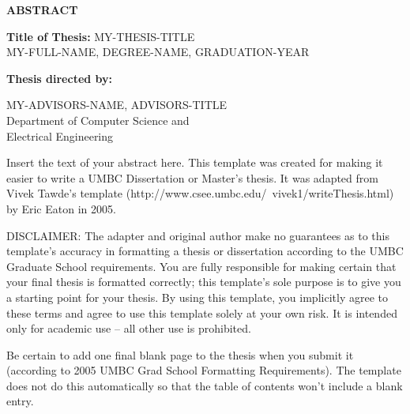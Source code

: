 \newpage
\pagestyle{empty}

\begin{center}
\vspace{0.1in}
\large{\bf ABSTRACT} \par  
\bigskip \bigskip
\end{center}

\begin{flushleft}
{\bf Title of Thesis:} MY-THESIS-TITLE\\
MY-FULL-NAME, DEGREE-NAME, GRADUATION-YEAR \\
\begin{singlespace}
{\bf Thesis directed by:}{\hspace{2.5mm}} \parbox[t]{3in}{MY-ADVISORS-NAME, ADVISORS-TITLE \\
Department of Computer Science and \\ Electrical Engineering}
\end{singlespace}
\end{flushleft}

Insert the text of your abstract here.  This template was created for making it easier to write a UMBC Dissertation or Master's thesis.  It was adapted from Vivek Tawde's template (http://www.csee.umbc.edu/~vivek1/writeThesis.html) by Eric Eaton in 2005.  

DISCLAIMER:  The adapter and original author make no guarantees as to this template's accuracy in formatting a thesis or dissertation according to the UMBC Graduate School requirements.  You are fully responsible for making certain that your final thesis is formatted correctly; this template's sole purpose is to give you a starting point for your thesis.  By using this template, you implicitly agree to these terms and agree to use this template solely at your own risk.  It is intended only for academic use -- all other use is prohibited.

Be certain to add one final blank page to the thesis when you submit it (according to 2005 UMBC Grad School Formatting Requirements).  The template does not do this automatically so that the table of contents won't include a blank entry.


\par\vfil

